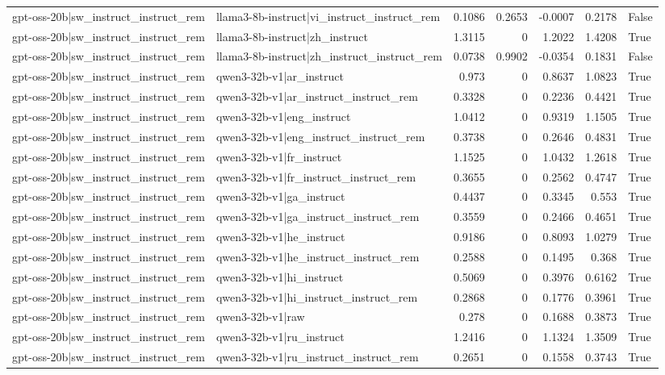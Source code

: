 \begin{table}
\begin{tabular}{l l r r r r l}
gpt-oss-20b|sw_instruct_instruct_rem & llama3-8b-instruct|vi_instruct_instruct_rem & 0.1086 & 0.2653 & -0.0007 & 0.2178 & False \\
gpt-oss-20b|sw_instruct_instruct_rem & llama3-8b-instruct|zh_instruct & 1.3115 & 0 & 1.2022 & 1.4208 & True \\
gpt-oss-20b|sw_instruct_instruct_rem & llama3-8b-instruct|zh_instruct_instruct_rem & 0.0738 & 0.9902 & -0.0354 & 0.1831 & False \\
gpt-oss-20b|sw_instruct_instruct_rem & qwen3-32b-v1|ar_instruct & 0.973 & 0 & 0.8637 & 1.0823 & True \\
gpt-oss-20b|sw_instruct_instruct_rem & qwen3-32b-v1|ar_instruct_instruct_rem & 0.3328 & 0 & 0.2236 & 0.4421 & True \\
gpt-oss-20b|sw_instruct_instruct_rem & qwen3-32b-v1|eng_instruct & 1.0412 & 0 & 0.9319 & 1.1505 & True \\
gpt-oss-20b|sw_instruct_instruct_rem & qwen3-32b-v1|eng_instruct_instruct_rem & 0.3738 & 0 & 0.2646 & 0.4831 & True \\
gpt-oss-20b|sw_instruct_instruct_rem & qwen3-32b-v1|fr_instruct & 1.1525 & 0 & 1.0432 & 1.2618 & True \\
gpt-oss-20b|sw_instruct_instruct_rem & qwen3-32b-v1|fr_instruct_instruct_rem & 0.3655 & 0 & 0.2562 & 0.4747 & True \\
gpt-oss-20b|sw_instruct_instruct_rem & qwen3-32b-v1|ga_instruct & 0.4437 & 0 & 0.3345 & 0.553 & True \\
gpt-oss-20b|sw_instruct_instruct_rem & qwen3-32b-v1|ga_instruct_instruct_rem & 0.3559 & 0 & 0.2466 & 0.4651 & True \\
gpt-oss-20b|sw_instruct_instruct_rem & qwen3-32b-v1|he_instruct & 0.9186 & 0 & 0.8093 & 1.0279 & True \\
gpt-oss-20b|sw_instruct_instruct_rem & qwen3-32b-v1|he_instruct_instruct_rem & 0.2588 & 0 & 0.1495 & 0.368 & True \\
gpt-oss-20b|sw_instruct_instruct_rem & qwen3-32b-v1|hi_instruct & 0.5069 & 0 & 0.3976 & 0.6162 & True \\
gpt-oss-20b|sw_instruct_instruct_rem & qwen3-32b-v1|hi_instruct_instruct_rem & 0.2868 & 0 & 0.1776 & 0.3961 & True \\
gpt-oss-20b|sw_instruct_instruct_rem & qwen3-32b-v1|raw & 0.278 & 0 & 0.1688 & 0.3873 & True \\
gpt-oss-20b|sw_instruct_instruct_rem & qwen3-32b-v1|ru_instruct & 1.2416 & 0 & 1.1324 & 1.3509 & True \\
gpt-oss-20b|sw_instruct_instruct_rem & qwen3-32b-v1|ru_instruct_instruct_rem & 0.2651 & 0 & 0.1558 & 0.3743 & True \\

\end{tabular}
\end{table}
